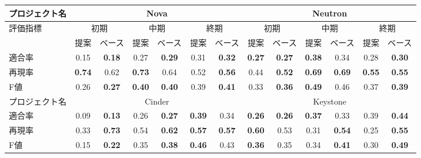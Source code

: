 \documentclass[T,J]{fose} %
\begin{document}
\begin{table}[t]
{\begin{tabular}{l|cc|cc|cc|cc|cc|cc}
\hline \hline
プロジェクト名               & \multicolumn{6}{c|}{Nova}                                                 & \multicolumn{6}{c}{Neutron}                                              \\ \hline
\multirow{2}{*}{評価指標} & \multicolumn{2}{c|}{初期} & \multicolumn{2}{c|}{中期} & \multicolumn{2}{c|}{終期} & \multicolumn{2}{c|}{初期} & \multicolumn{2}{c|}{中期} & \multicolumn{2}{c}{終期} \\ \cline{2-13}
                      & 提案         & ベース       & 提案         & ベース       & 提案         & ベース       & 提案         & ベース       & 提案         & ベース       & 提案         & ベース       \\ \hline
適合率                   & 0.15       & {\textbf{0.18}}      & 0.27       & {\textbf{0.29}}      & 0.31       & {\textbf{0.32}}      & {\textbf{0.27}}       & {\textbf{0.27}}      & {\textbf{0.38}}       & 0.34      & 0.28       & {\textbf{0.30}}      \\
再現率                   & {\textbf{0.74}}       & 0.62      & {\textbf{0.73}}       & 0.64      & 0.52       & {\textbf{0.56}}      & 0.44       & {\textbf{0.52}}      & {\textbf{0.69}}       & {\textbf{0.69}}      & {\textbf{0.55}}       & {\textbf{0.55}}      \\
F値                    & 0.26       & {\textbf{0.27}}      & {\textbf{0.40}}       & {\textbf{0.40}}      & 0.39       & {\textbf{0.41}}      & 0.33       & {\textbf{0.36}}      & {\textbf{0.49}}       & 0.46      & 0.37       & {\textbf{0.39}}      \\ \hline
プロジェクト名               & \multicolumn{6}{c|}{Cinder}                                               & \multicolumn{6}{c}{Keystone}                                             \\ \hline
適合率                   & 0.09       & {\textbf{0.13}}      & 0.26       & {\textbf{0.27}}      & {\textbf{0.39}}       & 0.34      & {\textbf{0.26}}       & {\textbf{0.26}}      & {\textbf{0.37}}       & 0.33      & 0.39       & {\textbf{0.44}}      \\
再現率                   & 0.33       & {\textbf{0.73}}      & 0.54       & {\textbf{0.62}}      & {\textbf{0.57}}       & {\textbf{0.57}}      & {\textbf{0.60}}       & 0.53      & 0.31       & {\textbf{0.54}}      & 0.25       & {\textbf{0.55}}      \\
F値                    & 0.15       & {\textbf{0.22}}      & 0.35       & {\textbf{0.38}}      & {\textbf{0.46}}       & 0.43      & {\textbf{0.36}}       & 0.35      & 0.34       & {\textbf{0.41}}      & 0.30       & {\textbf{0.49}}      \\ \hline

\end{tabular}}
\end{table}
\end{document}

